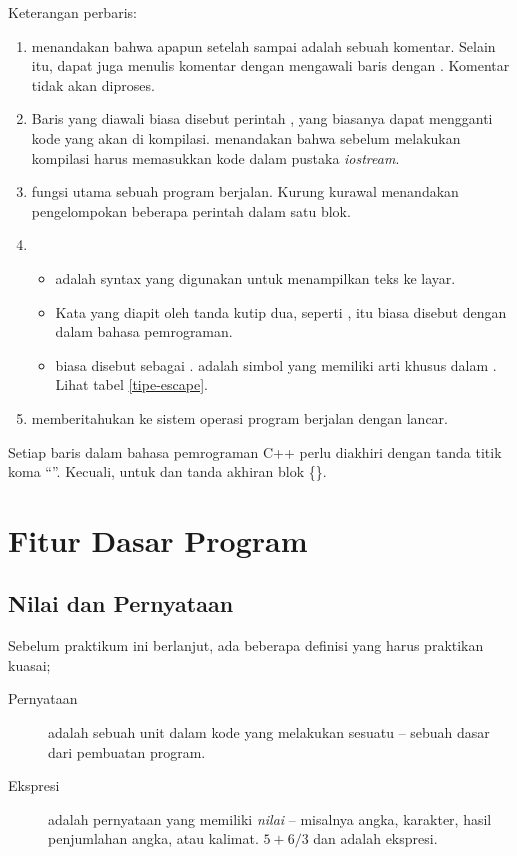 \documentclass[../main.tex]{subfiles}
\begin{document}
Keterangan perbaris:
\begin{enumerate}
  \item \code{/*\ldots*/} menandakan bahwa apapun setelah \code{/*} sampai
  \code{*/} adalah sebuah komentar. Selain itu, dapat juga menulis komentar
  dengan mengawali baris dengan \code{\slash{}\slash{}}.
  Komentar tidak akan diproses.
  \item Baris yang diawali \code{\#} biasa disebut perintah
  , yang biasanya dapat mengganti kode yang akan
  di kompilasi.  menandakan bahwa sebelum melakukan kompilasi
  harus memasukkan kode dalam pustaka \emph{iostream}.
  \item {} fungsi utama sebuah program berjalan.
  Kurung kurawal menandakan pengelompokan beberapa perintah dalam satu blok.
  \item
	\begin{itemize}
	\item {} adalah syntax yang digunakan untuk menampilkan teks
	  ke layar.
	\item Kata yang diapit oleh tanda kutip dua, seperti
	  , itu biasa disebut dengan
	   dalam bahasa pemrograman.
	\item {} biasa disebut sebagai
	  . 
	  adalah simbol yang memiliki arti khusus dalam .
	  Lihat tabel \ref{tipe-escape}.
	\end{itemize}
  \item {} memberitahukan ke sistem operasi program berjalan
  dengan lancar.
\end{enumerate}

Setiap baris dalam bahasa pemrograman C++ perlu diakhiri dengan tanda titik koma
\enquote{\code{;}}. Kecuali, untuk  dan
tanda akhiran blok \{\}.

\section{Fitur Dasar Program}
\subsection{Nilai dan Pernyataan}
Sebelum praktikum ini berlanjut, ada beberapa definisi yang harus praktikan
kuasai;

\begin{description}
\item[Pernyataan] adalah sebuah unit dalam kode yang melakukan sesuatu -- sebuah
  dasar dari pembuatan program.
\item[Ekspresi] adalah pernyataan yang memiliki \emph{nilai} -- misalnya angka,
  karakter, hasil penjumlahan angka, atau kalimat. \(5 + 6 / 3\) dan
   adalah ekspresi.
\end{description}
\end{document}
